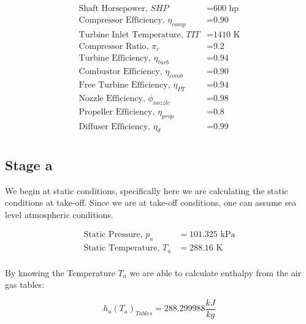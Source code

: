 \documentclass[titlepage]{article}
\begin{document}
    \begin{equation}
        \begin{aligned}
            \text{Shaft Horsepower, $SHP$} &= \text{600 hp} \\
            \text{Compressor Efficiency, $\eta_{comp}$} &= \text{0.90} \\
            \text{Turbine Inlet Temperature, $TIT$} &= \text{1410 K} \\
            \text{Compressor Ratio, $\pi_{c}$} &= \text{9.2} \\
            \text{Turbine Efficiency, $\eta_{turb}$} &= \text{0.94} \\
            \text{Combustor Efficiency, $\eta_{comb}$} &= \text{0.90} \\
            \text{Free Turbine Efficiency, $\eta_{PT}$} &= \text{0.94} \\
            \text{Nozzle Efficiency, $\phi_{nozzle}$} &= \text{0.98} \\
            \text{Propeller Efficiency, $\eta_{prop}$} &= \text{0.8} \\
            \text{Diffuser Efficiency, $\eta_{d}$} &= \text{0.99} \\
        \end{aligned}
    \end{equation}

    \subsection{Stage a}

    We begin at static conditions, specifically here we are calculating the static conditions at take-off. Since we are at take-off conditions, one can assume sea level atmospheric conditions.

    \begin{equation}
        \begin{aligned}
            \text{Static Pressure, $p_{a}$} &= 101.325 \text{ kPa} \\
            \text{Static Temperature, $T_{a}$} &= 288.16 \text{ K} \\
        \end{aligned}
    \end{equation}

    By knowing the Temperature $T_{a}$ we are able to calculate enthalpy from the air gas tables:

    \begin{equation}
        h_{a}(T_{a})_{Tables} = 288.299988 \frac{kJ}{kg}
    \end{equation}
\end{document}
